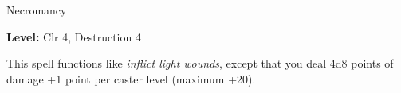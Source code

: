 
Necromancy

\textbf{Level:} Clr 4, Destruction 4

This spell functions like \textit{inflict light wounds}, except that you deal 4d8 
points of damage +1 point per caster level (maximum +20).

